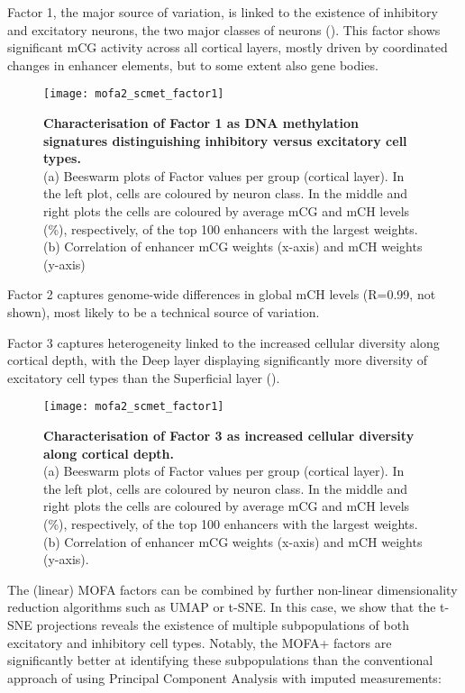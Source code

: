 Factor 1, the major source of variation, is linked to the existence of inhibitory and excitatory neurons, the two major classes of neurons (). This factor shows significant mCG activity across all cortical layers, mostly driven by coordinated changes in enhancer elements, but to some extent also gene bodies.

\begin{figure}[H]
	\centering
	\texttt{[image: mofa2\_scmet\_factor1]}
	\caption[]{
	\textbf{Characterisation of Factor 1 as DNA methylation signatures distinguishing inhibitory versus excitatory cell types\cite{Luo2016}.} \\
	(a) Beeswarm plots of Factor values per group (cortical layer). In the left plot, cells are coloured by neuron class. In the middle and right plots the cells are coloured by average mCG and mCH levels (\%), respectively, of the top 100 enhancers with the largest weights. \\
	(b) Correlation of enhancer mCG weights (x-axis) and mCH weights (y-axis)
	}
	\label{fig:mofa2_scmet_factor1}
\end{figure}


Factor 2 captures genome-wide differences in global mCH levels (R=0.99, not shown), most likely to be a technical source of variation.

Factor 3 captures heterogeneity linked to the increased cellular diversity along cortical depth, with the Deep layer displaying significantly more diversity of excitatory cell types than the Superficial layer ().  

\begin{figure}[H]
	\centering
	\texttt{[image: mofa2\_scmet\_factor1]}
	\caption[]{
	\textbf{Characterisation of Factor 3 as increased cellular diversity along cortical depth.} \\
	(a) Beeswarm plots of Factor values per group (cortical layer). In the left plot, cells are coloured by neuron class. In the middle and right plots the cells are coloured by average mCG and mCH levels (\%), respectively, of the top 100 enhancers with the largest weights. \\
	(b) Correlation of enhancer mCG weights (x-axis) and mCH weights (y-axis).
	}
	\label{fig:mofa2_scmet_factor1}
\end{figure}

The (linear) MOFA factors can be combined by further non-linear dimensionality reduction algorithms such as UMAP or t-SNE. In this case, we show that the t-SNE projections reveals the existence of multiple subpopulations of both excitatory and inhibitory cell types. Notably, the MOFA+ factors are significantly better at identifying these subpopulations than the conventional approach of using Principal Component Analysis with imputed measurements:

